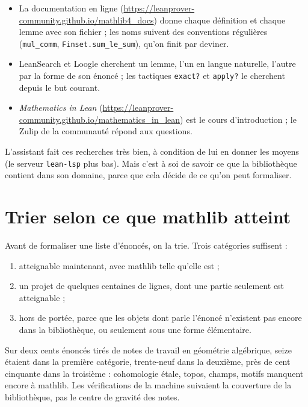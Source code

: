 \begin{itemize}
  \item La documentation en ligne (\url{https://leanprover-community.github.io/mathlib4_docs})
        donne chaque définition et chaque lemme avec son fichier ; les noms suivent des
        conventions régulières (\texttt{mul\_comm}, \texttt{Finset.sum\_le\_sum}), qu'on
        finit par deviner.
  \item LeanSearch et Loogle cherchent un lemme, l'un en langue naturelle, l'autre par la
        forme de son énoncé ; les tactiques \texttt{exact?} et \texttt{apply?} le
        cherchent depuis le but courant.
  \item \emph{Mathematics in Lean} (\url{https://leanprover-community.github.io/mathematics_in_lean})
        est le cours d'introduction ; le Zulip de la communauté répond aux questions.
\end{itemize}

L'assistant fait ces recherches très bien, à condition de lui en donner les moyens (le
serveur \texttt{lean-lsp} plus bas). Mais c'est à soi de savoir ce que la bibliothèque
contient dans son domaine, parce que cela décide de ce qu'on peut formaliser.

\section{Trier selon ce que mathlib atteint}

Avant de formaliser une liste d'énoncés, on la trie. Trois catégories suffisent :
\begin{enumerate}
  \item atteignable maintenant, avec mathlib telle qu'elle est ;
  \item un projet de quelques centaines de lignes, dont une partie seulement est
        atteignable ;
  \item hors de portée, parce que les objets dont parle l'énoncé n'existent pas encore
        dans la bibliothèque, ou seulement sous une forme élémentaire.
\end{enumerate}

\begin{exemple}
Sur deux cents énoncés tirés de notes de travail en géométrie algébrique, seize étaient
dans la première catégorie, trente-neuf dans la deuxième, près de cent cinquante dans la
troisième : cohomologie étale, topos, champs, motifs manquent encore à mathlib. Les vérifications
de la machine suivaient la couverture de la bibliothèque, pas le centre de gravité
des notes.
\end{exemple}


